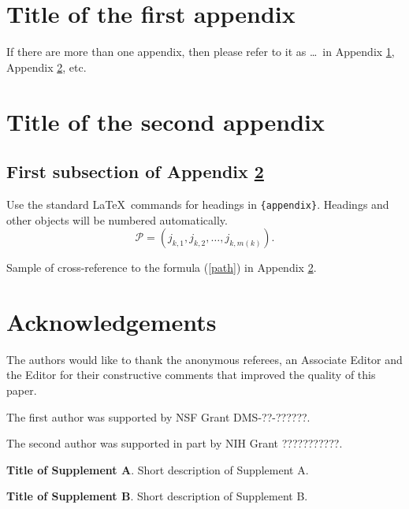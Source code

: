 \documentclass[aoas,preprint]{imsart}
\theoremstyle{remark}
\begin{document}
\begin{appendix}
\section{Title of the first appendix}\label{appA}
If there are more than one appendix, then please refer to it
as \ldots\ in Appendix \ref{appA}, Appendix \ref{appB}, etc.

\section{Title of the second appendix}\label{appB}
\subsection{First subsection of Appendix \protect\ref{appB}}

Use the standard \LaTeX\ commands for headings in \verb|{appendix}|.
Headings and other objects will be numbered automatically.
\begin{equation}
\mathcal{P}=(j_{k,1},j_{k,2},\dots,j_{k,m(k)}). \label{path}
\end{equation}

Sample of cross-reference to the formula (\ref{path}) in Appendix \ref{appB}.
\end{appendix}

\section*{Acknowledgements}
The authors would like to thank the anonymous referees, an Associate
Editor and the Editor for their constructive comments that improved the
quality of this paper.

The first author was supported by NSF Grant DMS-??-??????.

The second author was supported in part by NIH Grant ???????????.


\begin{supplement}
\textbf{Title of Supplement A}.
Short description of Supplement A.
\end{supplement}
\begin{supplement}
\textbf{Title of Supplement B}.
Short description of Supplement B.
\end{supplement}
\end{document}
